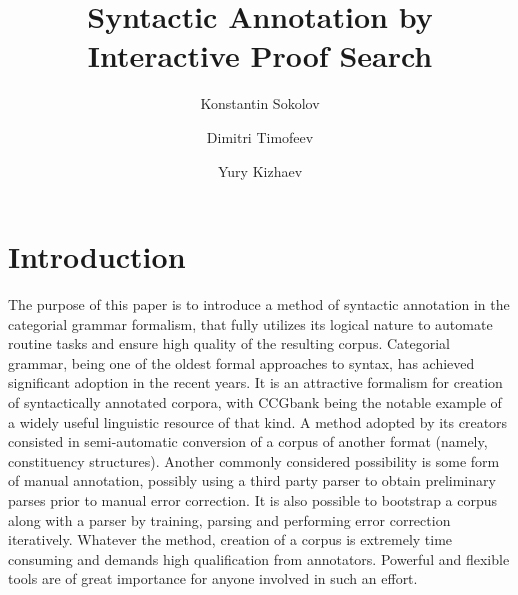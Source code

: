 \documentclass[a4paper]{article}
\theoremstyle{example-style}
\begin{document}
\title{Syntactic Annotation by Interactive Proof Search}
\author[1]{Konstantin Sokolov}
\author[2]{Dimitri Timofeev}
\author[3]{Yury Kizhaev}
\date{}

\maketitle

\section{Introduction}

The purpose of this paper is to introduce a method of syntactic annotation in the categorial grammar formalism, that fully utilizes its logical nature to automate routine tasks and ensure high quality of the resulting corpus. Categorial grammar, being one of the oldest formal approaches to syntax, has achieved significant adoption in the recent years. It is an attractive formalism for creation of syntactically annotated corpora, with CCGbank \parencite{hockenmaier2007ccgbank} being the notable example of a widely useful linguistic resource of that kind. A method adopted by its creators consisted in semi-automatic conversion of a corpus of another format (namely, constituency structures). Another commonly considered possibility is some form of manual annotation, possibly using a third party parser to obtain preliminary parses prior to manual error correction. It is also possible to bootstrap a corpus along with a parser by training, parsing and performing error correction iteratively. Whatever the method, creation of a corpus is extremely time consuming and demands high qualification from annotators. Powerful and flexible tools are of great importance for anyone involved in such an effort.
\end{document}
